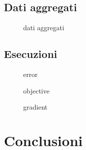 \documentclass[a4paper]{article}
\begin{document}
\subsection{Dati aggregati}

\begin{figure}
    \begin{center}
        \scalebox{0.65}{}
    \end{center}
    \caption{dati aggregati}
\end{figure}

\subsection{Esecuzioni}

\begin{figure}
    \begin{center}
        \scalebox{0.65}{}
    \end{center}
    \caption{error}
\end{figure}

\begin{figure}
    \begin{center}
        \scalebox{0.65}{}
    \end{center}
    \caption{objective}
\end{figure}

\begin{figure}
    \begin{center}
        \scalebox{0.65}{}
    \end{center}
    \caption{gradient}
\end{figure}

\section{Conclusioni}
\end{document}
